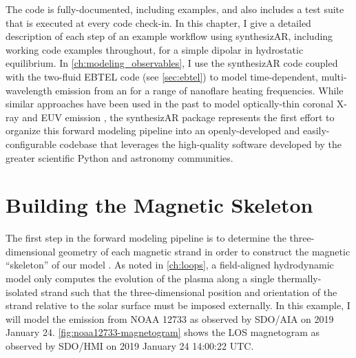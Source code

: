 The code is fully-documented, including examples, and also includes a test suite that is executed at every code check-in. In this chapter, I give a detailed description of each step of an example workflow using synthesizAR, including working code examples throughout, for a simple dipolar \AR{} in hydrostatic equilibrium. In \autoref{ch:modeling_observables}, I use the synthesizAR code coupled with the two-fluid EBTEL code (see \autoref{sec:ebtel}) to model time-dependent, multi-wavelength emission from an \AR{} for a range of nanoflare heating frequencies. While similar approaches have been used in the past to model optically-thin coronal X-ray and EUV emission \citep[e.g.][]{warren_hydrostatic_2006,schrijver_coronal_2004,lundquist_forward_2008,lundquist_forward_2008-1,bradshaw_patterns_2016,allred_3d_2018}, the synthesizAR package represents the first effort to organize this forward modeling pipeline into an openly-developed and easily-configurable codebase that leverages the high-quality software developed by the greater scientific Python and astronomy communities.

\section{Building the Magnetic Skeleton}

The first step in the forward modeling pipeline is to determine the three-dimensional geometry of each magnetic strand in order to construct the magnetic ``skeleton'' of our model \AR{}. As noted in \autoref{ch:loops}, a field-aligned hydrodynamic model only computes the evolution of the plasma along a single thermally-isolated strand such that the three-dimensional position and orientation of the strand relative to the solar surface must be imposed externally. In this example, I will model the emission from \AR{} NOAA 12733 as observed by SDO/AIA on 2019 January 24. \autoref{fig:noaa12733-magnetogram} shows the LOS magnetogram as observed by SDO/HMI on 2019 January 24 14:00:22 UTC.

